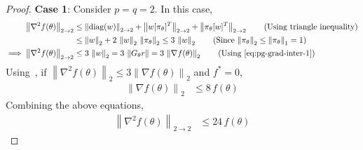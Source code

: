 \documentclass{article}
\newcommand{\norm}[1]{\left\|#1 \right\|}
\begin{document}
\begin{proof}
\textbf{Case 1}: Consider $p = q = 2$. In this case, 
\begin{align*}
\norm{\nabla^2 f(\theta)}_{2 \to 2} & \leq \norm{\text{diag}(w)}_{2 \to 2} + \norm{w [\pi_\theta]^T}_{2 \to 2} +  \norm{\pi_\theta [w]^T}_{2 \to 2} \tag{Using triangle inequality} \\    
& \leq \norm{w}_2 + 2 \, \norm{w}_2 \, \norm{\pi_\theta}_2 \leq 3 \, \norm{w}_2 \tag{Since $\norm{\pi_\theta}_2 \leq \norm{\pi_\theta}_1 = 1$} \\
\implies \norm{\nabla^2 f(\theta)}_{2 \to 2} & \leq 3 \, \norm{w}_2 = 3 \, \norm{G_\theta r} = 3 \, \norm{\nabla f(\theta)}_{2} \tag{Using~\cref{eq:pg-grad-inter-1}}
\end{align*}
Using~\citep[Proposition 3]{vaswani2025armijo}, if $\norm{\nabla^2 f(\theta)}_{2} \leq 3 \norm{\nabla f(\theta)}_2$ and $f^* = 0$, 
\begin{align*}
\norm{\nabla f(\theta)}_2 & \leq 8 \, f(\theta)   
\end{align*}
Combining the above equations, 
\begin{align*}
\norm{\nabla^2 f(\theta)}_{2 \to 2} & \leq 24 \, f(\theta)    
\end{align*}


\end{proof}
\end{document}
